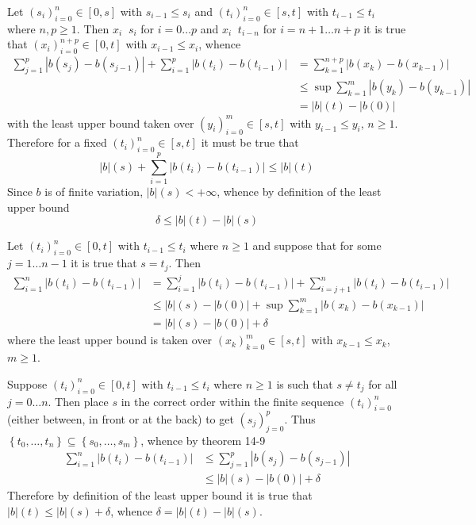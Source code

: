 \documentclass[a4paper]{article}
\newcommand{\obj}[1]{\left\{ #1 \right \}}
\newcommand{\clo}[1]{\left [ #1 \right ]}
\newcommand{\brac}[1]{\left ( #1 \right )}
\newcommand{\abs}[1]{\left | #1 \right |}
\newcommand{\defn}{\mathop{\overset{\Delta}{=}}\nolimits}
\begin{document}
Let $\brac{s_i}_{i=0}^n\in\clo{0,s}$ with $s_{i-1}\leq s_i$ and $\brac{t_i}_{i=0}^n\in\clo{s,t}$ with $t_{i-1}\leq t_i$ where $n,p\geq1$. Then $x_i\defn s_i$ for $i=0\ldots p$ and $x_i\defn t_{i-n}$ for $i={n+1}\ldots {n+p}$ it is true that $\brac{x_i}_{i=0}^{n+p}\in\clo{0,t}$ with $x_{i-1}\leq x_i$, whence \begin{align*}\sum_{j=1}^p\abs{b\brac{s_j}-b\brac{s_{j-1}}} + \sum_{i=1}^p\abs{b\brac{t_i}-b\brac{t_{i-1}}} &= \sum_{k=1}^{n+p}\abs{b\brac{x_k}-b\brac{x_{k-1}}}\\&\leq \sup\sum_{k=1}^m\abs{b\brac{y_k}-b\brac{y_{k-1}}}\\&=\abs{b}\brac{t} - \abs{b\brac{0}}\end{align*} with the least upper bound taken over $\brac{y_i}_{i=0}^m\in\clo{s,t}$ with $y_{i-1}\leq y_i$, $n\geq1$. Therefore for a fixed $\brac{t_i}_{i=0}^n\in\clo{s,t}$ it must be true that \[\abs{b}\brac{s}+\sum_{i=1}^p\abs{b\brac{t_i}-b\brac{t_{i-1}}}\leq \abs{b}\brac{t}\] Since $b$ is of finite variation, $\abs{b}\brac{s}<+\infty$, whence by definition of the least upper bound \[\delta \leq \abs{b}\brac{t}-\abs{b}\brac{s}\]

Let $\brac{t_i}_{i=0}^n\in\clo{0,t}$ with $t_{i-1}\leq t_i$ where $n\geq1$ and suppose that for some $j=1\ldots{n-1}$ it is true that $s=t_j$. Then \begin{align*}\sum_{i=1}^n\abs{b\brac{t_i}-b\brac{t_{i-1}}} &= \sum_{i=1}^j \abs{b\brac{t_i}-b\brac{t_{i-1}}}+\sum_{i=j+1}^n \abs{b\brac{t_i}-b\brac{t_{i-1}}}\\&\leq \abs{b}\brac{s} - \abs{b\brac{0}} + \sup \sum_{k=1}^m \abs{b\brac{x_k}-b\brac{x_{k-1}}}\\&= \abs{b}\brac{s} - \abs{b\brac{0}} + \delta\end{align*} where the least upper bound is taken over $\brac{x_k}_{k=0}^m\in\clo{s,t}$ with $x_{k-1}\leq x_k$, $m\geq1$.

Suppose $\brac{t_i}_{i=0}^n\in\clo{0,t}$ with $t_{i-1}\leq t_i$ where $n\geq1$ is such that $s\neq t_j$ for all $j=0 \ldots n$. Then place $s$ in the correct order within the finite sequence $\brac{t_i}_{i=0}^n$ (either between, in front or at the back) to get $\brac{s_j}_{j=0}^p$. Thus $\obj{t_0,\ldots,t_n}\subseteq \obj{s_0,\ldots,s_m}$, whence by theorem 14-9 \begin{align*}\sum_{i=1}^n\abs{b\brac{t_i}-b\brac{t_{i-1}}}&\leq \sum_{j=1}^p\abs{b\brac{s_j}-b\brac{s_{j-1}}}\\&\leq \abs{b}\brac{s} - \abs{b\brac{0}} + \delta\end{align*} Therefore by definition of the least upper bound it is true that $\abs{b}\brac{t}\leq \abs{b}\brac{s}+\delta$, whence $\delta = \abs{b}\brac{t}-\abs{b}\brac{s}$.\\
\end{document}
